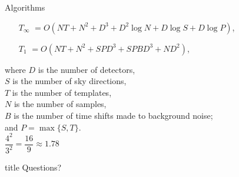 \documentclass{beamer}
\begin{document}
\begin{frame}{Algorithms}
    \begin{itemize}
        \item[\(T_\infty\)] \(= O(NT + N^2 + D^3 + D^2 \log N + D \log S + D \log P)\),
        \item[\(T_1\)] \(= O(NT + N^2 + SPD^3 + SPBD^3 + ND^2)\),
    \end{itemize}
    where \(D\) is the number of detectors,\\
    \(S\) is the number of sky directions,\\
    \(T\) is the number of templates,\\
    \(N\) is the number of samples,\\
    \(B\) is the number of time shifts made to background noise;\\
    and \(P = \max\{S, T\}\).\\
    \centering
    \pause{} \(\dfrac{4^2}{3^2} = \dfrac{16}{9} \approx{} 1.78\)
\end{frame}

\begin{frame}
  \vfill
  \centering
  \begin{beamercolorbox}[sep=8pt,center,shadow=true,rounded=true]{title}
    Questions?\par%
  \end{beamercolorbox}
  \vfill
\end{frame}
\end{document}
